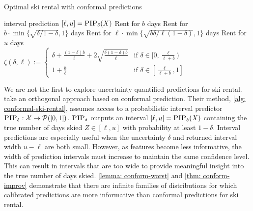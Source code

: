 \begin{algorithm}[tb]
   \caption{\cite{Sun24:Online} Optimal ski rental with conformal predictions}
    \label{alg: conformal-ski-rental}
\begin{algorithmic}
    interval prediction $[\ell, u] = \textsc{PIP}_\delta(X)$
        \STATE Rent for $b$ days
        \STATE Rent for $b \cdot \min\{\sqrt{\delta/1-\delta},1\}$ days
   \ELSE
   \STATE Rent for $\ell \cdot \min\{\sqrt{b\delta/ \ell(1-\delta)}, 1\}$ days
   \ELSE
   \STATE Rent for $u$ days
    \ENDIF
   \ENDIF\\
   \hrulefill
   \STATE $\zeta(\delta, \ell):=\begin{cases}
        \delta + \frac{(1-\delta)b}{\ell} +2\sqrt{\frac{\delta(1-\delta)b}{\ell}} &\text{if $\delta \in [0, \frac{\ell}{\ell + b})$} \\
        1+\frac{b}{\ell} &\text{if $\delta \in [\frac{\ell}{\ell+b}, 1]$}
    \end{cases}$
\end{algorithmic}
\end{algorithm}

We are not the first to explore uncertainty quantified predictions for ski rental. \citet{Sun24:Online} take an orthogonal approach based on conformal prediction. Their method, \cref{alg: conformal-ski-rental}, assumes access to a probabilistic interval predictor $\textsc{PIP}_\delta:\mathcal{X} \to \mathcal{P}([0,1])$. $\textsc{PIP}_\delta$ outputs an interval $[\ell, u] = \textsc{PIP}_\delta(X)$ containing the true number of days skied $Z \in [\ell, u]$ with probability at least $1-\delta$. Interval predictions are especially useful when the uncertainty $\delta$ and returned interval width $u-\ell$ are both small. However, as features become less informative, the width of prediction intervals must increase to maintain the same confidence level. This can result in intervals that are too wide to provide meaningful insight into the true number of days skied. \cref{lemma: conform-worst} and \cref{thm: conform-improv} demonstrate that there are infinite families of distributions for which calibrated predictions are more informative than conformal predictions for ski rental.



